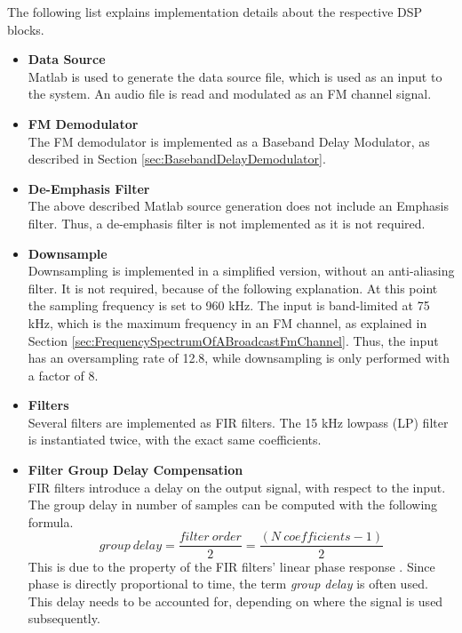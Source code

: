 The following list explains implementation details about the respective DSP blocks.
\begin{itemize}
  \item \textbf{Data Source}\\
      Matlab is used to generate the data source file, which is used as an input to the system.
      An audio file is read and modulated as an FM channel signal.

  \item \textbf{FM Demodulator}\\
      The FM demodulator is implemented as a Baseband Delay Modulator, as described in Section \ref{sec:BasebandDelayDemodulator}.

  \item \textbf{De-Emphasis Filter}\\
      The above described Matlab source generation does not include an Emphasis filter.
      Thus, a de-emphasis filter is not implemented as it is not required.

  \item \textbf{Downsample}\\
      Downsampling is implemented in a simplified version, without an anti-aliasing filter.
      It is not required, because of the following explanation.
      At this point the sampling frequency is set to 960 kHz.
      The input is band-limited at 75 kHz, which is the maximum frequency in an FM channel, as explained in Section \ref{sec:FrequencySpectrumOfABroadcastFmChannel}.
      Thus, the input has an oversampling rate of 12.8, while downsampling is only performed with a factor of 8.

  \item \textbf{Filters}\\
      Several filters are implemented as FIR filters.
      The 15 kHz lowpass (LP) filter is instantiated twice, with the exact same coefficients.

  \item \textbf{Filter Group Delay Compensation}\\
      FIR filters introduce a delay on the output signal, with respect to the input.
      The group delay in number of samples can be computed with the following formula.
      \begin{equation}
        group\ delay = \frac{filter\ order}{2} = \frac{(N\ coefficients - 1)}{2}
      \end{equation}
      This is due to the property of the FIR filters' linear phase response \cite{GaziOrhan2018UDSP}.
      Since phase is directly proportional to time, the term \textit{group delay} is often used.
      This delay needs to be accounted for, depending on where the signal is used subsequently.


\end{itemize}
